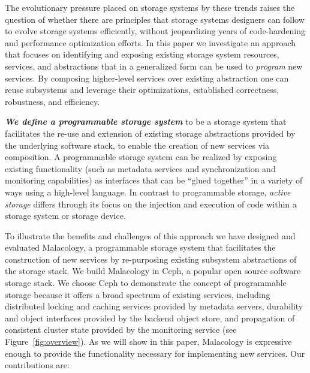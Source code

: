 \documentclass[preprint]{sigplanconf-eurosys}
\begin{document}
The evolutionary pressure placed on storage systems by these trends raises the
question of whether
there are principles that storage systems designers can follow
to evolve storage systems efficiently, without jeopardizing years of
code-hardening and performance optimization efforts.
In this paper we investigate an approach that focuses on 
identifying and exposing existing
storage system resources, services, and abstractions that in a generalized form
can be used to \emph{program} new services. By composing higher-level services
over existing abstraction one can reuse
subsystems and leverage their optimizations, established correctness,
robustness, and efficiency. 

{\it \textbf{We define a programmable storage system}} to be a storage system that facilitates the 
re-use and extension of existing storage abstractions provided by the underlying software stack,
to enable the creation of new services via composition.
A programmable storage system can be realized by exposing existing functionality (such as 
metadata services and synchronization and monitoring capabilities) as interfaces that can be ``glued together''
in a variety of ways
using a high-level language. In contrast to programmable storage, 
\emph{active storage} differs through its focus on the injection and
execution of code within a storage system or storage device.

To illustrate the benefits and challenges of this approach we have designed and
evaluated Malacology, a programmable storage system 
that facilitates the construction of
new
services by re-purposing existing subsystem abstractions of the storage stack.
We build Malacology in Ceph, a popular open source software storage stack.
We choose Ceph to demonstrate the concept of programmable storage because it
offers a broad spectrum of existing services, including distributed locking and
caching services provided by metadata servers, durability and object interfaces
provided by the backend object store, and propagation of consistent
cluster state provided by the monitoring service (see
Figure~\ref{fig:overview}). As we will show in this paper, Malacology is
expressive enough to provide the functionality necessary for implementing new
services. Our contributions are:
\end{document}
